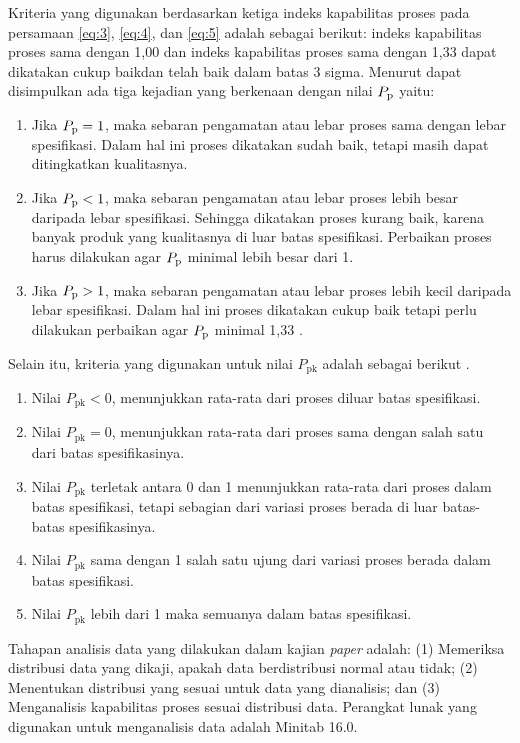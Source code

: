 Kriteria yang digunakan berdasarkan ketiga indeks kapabilitas proses pada persamaan \eqref{eq:3}, \eqref{eq:4}, dan \eqref{eq:5} adalah sebagai berikut: indeks kapabilitas proses sama dengan 1,00 dan indeks kapabilitas proses sama dengan 1,33 dapat dikatakan cukup baikdan telah baik dalam batas 3 sigma. Menurut  dapat disimpulkan ada tiga kejadian yang berkenaan dengan nilai $P_{\mathrm{p}}$ yaitu:

\begin{enumerate}[label=\alph*., align=left, nosep, labelsep=0pt, labelwidth=\parindent]
    \item Jika $P_{\mathrm{p}} = 1$, maka sebaran pengamatan atau lebar proses sama dengan lebar spesifikasi. Dalam hal ini proses dikatakan sudah baik, tetapi masih dapat ditingkatkan kualitasnya.
    \item Jika $P_{\mathrm{p}} < 1$, maka sebaran pengamatan atau lebar proses lebih besar daripada lebar spesifikasi. Sehingga dikatakan proses kurang baik, karena banyak produk yang kualitasnya di luar batas spesifikasi. Perbaikan proses harus dilakukan agar $P_{\mathrm{p}}$ minimal lebih besar dari 1.
    \item Jika $P_{\mathrm{p}} > 1$, maka sebaran pengamatan atau lebar proses lebih kecil daripada lebar spesifikasi. Dalam hal ini proses dikatakan cukup baik tetapi perlu dilakukan perbaikan agar $P_{\mathrm{p}}$ minimal 1,33 \cite{gasperz2004production}.
\end{enumerate}

Selain itu, kriteria yang digunakan untuk nilai $P_{\mathrm{pk}}$ adalah sebagai berikut \cite{ariani2004}.

\begin{enumerate}[label=\alph*., align=left, nosep, labelsep=0pt, labelwidth=\parindent]
    \item Nilai $P_{\mathrm{pk}} < 0$, menunjukkan rata-rata dari proses diluar batas spesifikasi.
    \item Nilai $P_{\mathrm{pk}} = 0$, menunjukkan rata-rata dari proses sama dengan salah satu dari batas spesifikasinya.
    \item Nilai $P_{\mathrm{pk}}$ terletak antara 0 dan 1 menunjukkan rata-rata dari proses dalam batas spesifikasi, tetapi sebagian dari variasi proses berada di luar batas-batas spesifikasinya.
    \item Nilai $P_{\mathrm{pk}}$ sama dengan 1 salah satu ujung dari variasi proses berada dalam batas spesifikasi.
    \item Nilai $P_{\mathrm{pk}}$ lebih dari 1 maka semuanya dalam batas spesifikasi.
\end{enumerate}

Tahapan analisis data yang dilakukan dalam kajian \textit{paper} adalah: (1) Memeriksa distribusi data yang dikaji, apakah data berdistribusi normal atau tidak; (2) Menentukan distribusi yang sesuai untuk data yang dianalisis; dan (3) Menganalisis kapabilitas proses sesuai distribusi data. Perangkat lunak yang digunakan untuk menganalisis data adalah Minitab 16.0.
